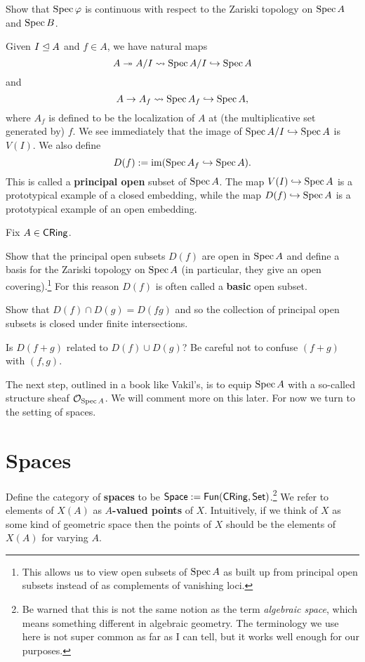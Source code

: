 \documentclass[11pt]{article}
\renewcommand{\phi}{\varphi}
\begin{document}
\begin{exercise}
Show that $\Spec\phi$ is continuous with respect to the Zariski topology on $\operatorname{Spec} A$ and $\operatorname{Spec} B$.
\end{exercise}

Given $I\trianglelefteq A$ and $f\in A$, we have natural maps 
$$A\twoheadrightarrow A/I\leadsto\operatorname{Spec} A/I\hookrightarrow\operatorname{Spec} A$$
and
$$A\to A_f\leadsto\operatorname{Spec} A_f\hookrightarrow\operatorname{Spec} A,$$
where $A_f$ is defined to be the localization of $A$ at (the multiplicative set generated by) $f$. We see immediately that the image of $\operatorname{Spec} A/I\hookrightarrow\operatorname{Spec} A$ is $V(I)$. We also define 
$$D(f):=\operatorname{im}(\operatorname{Spec} A_f\hookrightarrow\operatorname{Spec} A).$$
This is called a \textbf{principal open} subset of $\operatorname{Spec} A$. The map $V(I)\hookrightarrow\operatorname{Spec} A$ is a prototypical example of a closed embedding, while the map $D(f)\hookrightarrow\operatorname{Spec} A$ is a prototypical example of an open embedding.

\begin{exercise}
Fix $A\in\operatorname{\mathsf{CRing}}$.
\begin{enum}{\alph}
\item Show that the principal open subsets $D(f)$ are open in $\operatorname{Spec} A$ and define a basis for the Zariski topology on $\operatorname{Spec} A$ (in particular, they give an open covering).\footnote{This allows us to view open subsets of $\operatorname{Spec} A$ as built up from principal open subsets instead of as complements of vanishing loci.} For this reason $D(f)$ is often called a \textbf{basic} open subset.

\item Show that $D(f)\cap D(g)=D(fg)$ and so the collection of principal open subsets is closed under finite intersections.

\item Is $D(f+g)$ related to $D(f)\cup D(g)$? Be careful not to confuse $(f+g)$ with $(f,g)$.
\end{enum}
\end{exercise}

The next step, outlined in a book like Vakil's, is to equip $\operatorname{Spec} A$ with a so-called structure sheaf $\mathcal{O}_{\operatorname{Spec} A}$. We will comment more on this later. For now we turn to the setting of spaces.

\section{Spaces}
\begin{definition}
Define the category of \textbf{spaces} to be $\operatorname{\mathsf{Space}}:=\operatorname{\mathsf{Fun}}(\operatorname{\mathsf{CRing}},\operatorname{\mathsf{Set}})$.\footnote{Be warned that this is not the same notion as the term \emph{algebraic space}, which means something different in algebraic geometry. The terminology we use here is not super common as far as I can tell, but it works well enough for our purposes.} We refer to elements of $X(A)$ as \textbf{$A$-valued points} of $X$. Intuitively, if we think of $X$ as some kind of geometric space then the points of $X$ should be the elements of $X(A)$ for varying $A$.
\end{definition}
\end{document}
